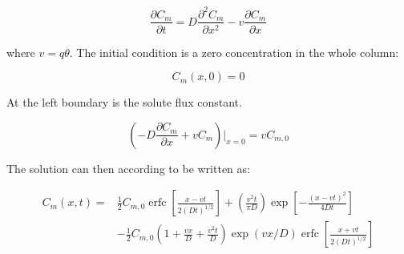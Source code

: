 \documentclass{report}
\newcommand{\erfc}{\operatorname{erfc}}                 %
\begin{document}
\begin{equation}
\frac{\partial C_m}{\partial t}=D\frac{\partial^2C_m}{\partial
  x^2}-v\frac{\partial C_m}{\partial x}
\end{equation}

where $v=q\theta$. The initial condition is a zero concentration in
the whole column:

\begin{equation}
C_m(x,0)=0
\end{equation}


At the left boundary is the solute flux constant.


\begin{equation}
\left(-D\frac{\partial C_m}{\partial x}+vC_m \right)\bigg\vert_{x=0}=vC_{m,0}
\end{equation}

The solution can then according to \cite{Genuchtenanalytical} be
written as:

\begin{equation}
\begin{split}
C_m(x,t) = &\frac{1}{2} C_{m,0}  \erfc\left
  [\frac{x-vt}{2(Dt)^{1/2}}\right]+\left(\frac{v^2t}{\pi
  D}\right)\exp\left[-\frac{(x-vt)^2}{4Dt}\right ] \\
&-  \frac{1}{2} C_{m,0} (1+\frac{vx}{D}+\frac{v^2t}{D})\exp(vx/D)\erfc\left[\frac{x+vt}{2(Dt)^{1/2}}\right]
\end{split}
\end{equation}

\end{document}
